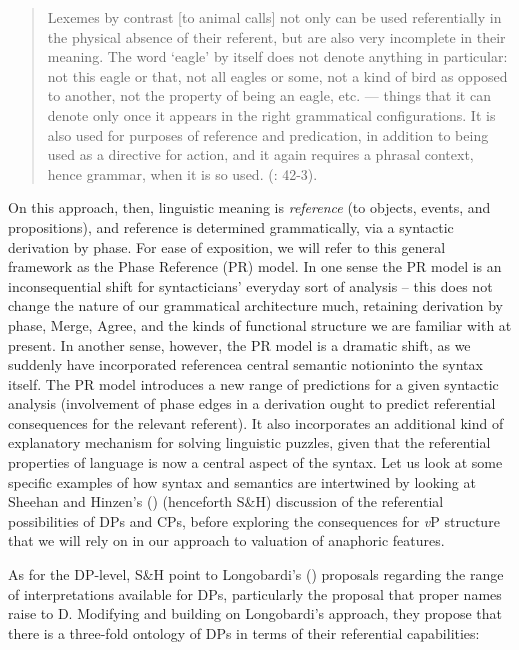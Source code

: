 \begin{quote}

Lexemes by contrast [to animal calls] not only can be used referentially in the physical absence of their referent, but are also very incomplete in their meaning. The word ‘eagle’ by itself does not denote anything in particular: not this eagle or that, not all eagles or some, not a kind of bird as opposed to another, not the property of being an eagle, etc. — things that it can denote only once it appears in the right grammatical configurations. It is also used for purposes of reference and predication, in addition to being used as a directive for action, and it again requires a phrasal context, hence grammar, when it is so used. (\citealt{HinzenSheehan:2013}: 42-3). 

\end{quote}

On this approach, then, linguistic meaning is \textit{reference} (to objects, events, and propositions), and reference is determined grammatically, via a syntactic derivation by phase. For ease of exposition, we will refer to this general framework as the Phase Reference (PR) model. In one sense the PR model is an inconsequential shift for syntacticians’ everyday sort of analysis – this does not change the nature of our grammatical architecture much, retaining derivation by phase, Merge, Agree, and the kinds of functional structure we are familiar with at present. In another sense, however, the PR model is a dramatic shift, as we suddenly have incorporated reference\textemdash a central semantic notion\textemdash into the syntax itself. The PR model introduces a new range of predictions for a given syntactic analysis (involvement of phase edges in a derivation ought to predict referential consequences for the relevant referent). It also incorporates an additional kind of explanatory mechanism for solving linguistic puzzles, given that the referential properties of language is now a central aspect of the syntax. Let us look at some specific examples of how syntax and semantics are intertwined by looking at Sheehan and Hinzen’s (\citeyear{SheehanHinzen:2011}) (henceforth S\&H) discussion of the referential possibilities of DPs and CPs, before exploring the consequences for \textit{v}P structure that we will rely on in our approach to valuation of anaphoric features.  

As for the DP-level, S\&H point to Longobardi’s (\citeyear{Longobardi:1994,Longobardi:2005}) proposals regarding the range of interpretations available for DPs, particularly the proposal that proper names raise to D. Modifying and building on Longobardi’s approach, they propose that there is a three-fold ontology of DPs in terms of their referential capabilities: 

